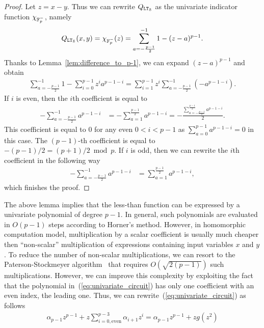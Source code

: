   \begin{proof}
    Let $z = x-y$.
    Thus we can rewrite $Q_{\mathtt{LT}_{\mathcal{S}}}$ as the univariate indicator function $\chi_{\mathbb{F}_p^-}$, namely
    \begin{align*}
      Q_{\mathtt{LT}_{\mathcal{S}}}(x,y) = \chi_{\mathbb{F}_p^-}(z) = \sum_{a=-\frac{p-1}{2}}^{-1} 1 - (z - a)^{p-1}.
    \end{align*}
    Thanks to Lemma~\ref{lem:difference_to_p-1}, we can expand $(z-a)^{p-1}$ and obtain
    \begin{align*}
      \sum_{a=-\frac{p-1}{2}}^{-1} 1 - \sum_{i=0}^{p-1} z^i a^{p-1-i}
      = \sum_{i=1}^{p-1} z^i \sum_{a=-\frac{p-1}{2}}^{-1} (-a^{p-1-i}).
    \end{align*}
    If $i$ is even, then the $i$th coefficient is equal to
    \begin{align*}
      -\sum_{a=-\frac{p-1}{2}}^{-1} a^{p-1-i} &= -\sum_{a=1}^{\frac{p-1}{2}} a^{p-1-i} = -\frac{\sum_{a=-\frac{p-1}{2}}^{\frac{p-1}{2}} a^{p-1-i}}{2}.
    \end{align*}
    This coefficient is equal to $0$ for any even $0<i < p-1$ as $\sum_{a=0}^{p-1} a^{p-1-i} = 0$ in this case.
    The $(p-1)$-th coefficient is equal to $-(p-1)/2 = (p+1)/2 \bmod p$.
    If $i$ is odd, then we can rewrite the $i$th coefficient in the following way
    \begin{align*}
      -\sum_{a=-\frac{p-1}{2}}^{-1} a^{p-1-i} &= \sum_{a=1}^{\frac{p-1}{2}} a^{p-1-i},
    \end{align*}
    which finishes the proof.
  \end{proof}
  The above lemma implies that the less-than function can be expressed by a univariate polynomial of degree $p-1$.
  In general, such polynomials are evaluated in $O(p-1)$ steps according to Horner's method.
  However, in homomorphic computation model, multiplication by a scalar coefficient is usually much cheaper then ``non-scalar'' multiplication of expressions containing input variables $x$ and $y$.
  To reduce the number of non-scalar multiplications, we can resort to the Paterson-Stockmeyer algorithm~\cite{SIAM:PS73} that requires $O(\sqrt{2(p-1)})$ such multiplications.
  However, we can improve this complexity by exploiting the fact that the polynomial in~(\ref{eq:univariate_circuit}) has only one coefficient with an even index, the leading one.
  Thus, we can rewrite~(\ref{eq:univariate_circuit}) as follows
  \begin{align*}
    \alpha_{p-1} z^{p-1} + z \sum_{i=0, \text{even}}^{p-3} \alpha_{i+1} z^i =  \alpha_{p-1} z^{p-1} + z g(z^2)
  \end{align*}
